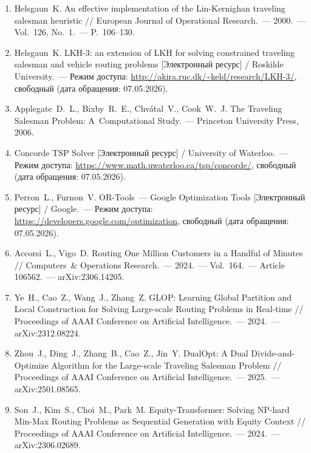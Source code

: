 \documentclass[a4paper,14pt]{extreport}
\begin{document}
\begin{enumerate}
\item Helsgaun~K. An effective implementation of the Lin-Kernighan traveling salesman heuristic // European Journal of Operational Research.~--- 2000.~--- Vol.~126, No.~1.~--- P.~106--130.

\item Helsgaun~K. LKH-3: an extension of LKH for solving constrained traveling salesman and vehicle routing problems [Электронный ресурс] / Roskilde University.~--- Режим доступа: \url{http://akira.ruc.dk/~keld/research/LKH-3/}, свободный (дата обращения: 07.05.2026).

\item Applegate~D.~L., Bixby~R.~E., Chvátal~V., Cook~W.~J. The Traveling Salesman Problem: A~Computational Study.~--- Princeton University Press, 2006.

\item Concorde TSP Solver [Электронный ресурс] / University of Waterloo.~--- Режим доступа: \url{https://www.math.uwaterloo.ca/tsp/concorde/}, свободный (дата обращения: 07.05.2026).

\item Perron~L., Furnon~V. OR-Tools~--- Google Optimization Tools [Электронный ресурс] / Google.~--- Режим доступа: \url{https://developers.google.com/optimization}, свободный (дата обращения: 07.05.2026).

\item Accorsi~L., Vigo~D. Routing One Million Customers in a Handful of Minutes // Computers~\& Operations Research.~--- 2024.~--- Vol.~164.~--- Article 106562.~--- arXiv:2306.14205.

\item Ye~H., Cao~Z., Wang~J., Zhang~Z. GLOP: Learning Global Partition and Local Construction for Solving Large-scale Routing Problems in Real-time // Proceedings of AAAI Conference on Artificial Intelligence.~--- 2024.~--- arXiv:2312.08224.

\item Zhou~J., Ding~J., Zhang~B., Cao~Z., Jin~Y. DualOpt: A Dual Divide-and-Optimize Algorithm for the Large-scale Traveling Salesman Problem // Proceedings of AAAI Conference on Artificial Intelligence.~--- 2025.~--- arXiv:2501.08565.

\item Son~J., Kim~S., Choi~M., Park~M. Equity-Transformer: Solving NP-hard Min-Max Routing Problems as Sequential Generation with Equity Context // Proceedings of AAAI Conference on Artificial Intelligence.~--- 2024.~--- arXiv:2306.02689.


\end{enumerate}
\end{document}
